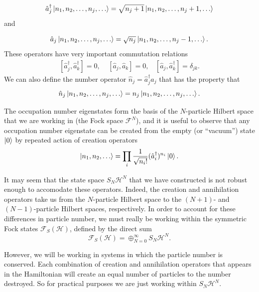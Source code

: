 \documentclass[a4paper,10pt]{article}
\begin{document}
\begin{equation}
 \hat{a}_{j}^{\dagger}\ket{n_1,n_2,\dots,n_{j},\dots}=\sqrt{n_j+1}\ket{n_1,n_2,\dots,n_{j}+1,\dots}
\end{equation}
and 

\begin{equation}
 \hat{a}_{j}\ket{n_1,n_2,\dots,n_{j},\dots}=\sqrt{n_j}\ket{n_1,n_2,\dots,n_{j}-1,\dots}.
\end{equation}
These operators have very important commutation relations
\begin{equation}
\begin{align*}
 [\hat{a}_{j}^{\dagger},\hat{a}_{k}^{\dagger}]=0, \ \ \ \ \ [\hat{a}_{j},\hat{a}_{k}]=0,\ \ \ \ [\hat{a}_{j},\hat{a}_{k}^{\dagger}]=\delta_{jk}.
 \end{align*}
\end{equation}
We can also define the number operator $\hat{n}_j=\hat{a}_{j}^{\dagger}\hat{a}_j$ that has the property that
\begin{equation}
 \hat{n}_{j}\ket{n_1,n_2,\dots,n_{j},\dots}=n_{j}\ket{n_1,n_2,\dots,n_{j},\dots}.
\end{equation}

The occupation number eigenstates form the basis of the $N$-particle Hilbert space that we are working in (the Fock space $\mathcal{F}^N$), and it 
is useful to observe that any occupation number eigenstate can be created from the empty (or ``vacuum'') state $\ket{0}$ by repeated action of 
creation operators \cite{Altland2010}
\begin{equation}
 \ket{n_1,n_2,\dots}=\prod_i\frac{1}{\sqrt{n_i!}}(\hat{a}_i^{\dagger})^{n_i}\ket{0}.
\end{equation}

It may seem that the state space $S_N\mathcal{H}^N$ that we have constructed is not robust enough to accomodate these operators. Indeed, the creation and
annihilation operators take us from the $N$-particle Hilbert space to the $(N+1)$- and $(N-1)$-particle Hilbert spaces, respectively. In order to
account for these differences in particle number, we must really be working within the symmetric Fock states $\mathcal{F}_S(\mathcal{H})$, defined by the direct sum \cite{Blank1999}
\begin{equation}
 \mathcal{F}_S(\mathcal{H})=\oplus_{N=0}^\infty S_N\mathcal{H}^N.
\end{equation}

However, we will be working in systems in which the particle number is conserved. Each combination of creation and annihilation operators that appears in the Hamiltonian
will create an equal number of particles to the number destroyed. So for practical purposes we are just working within $S_N\mathcal{H}^N$.
\end{document}
